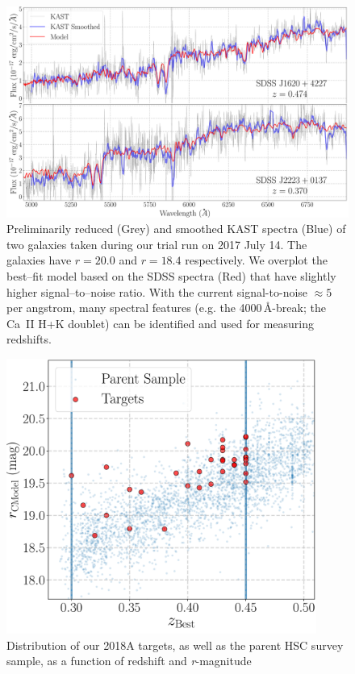 \documentclass[letterpaper,12pt]{article}
\begin{document}
\begin{figure}[hbt]
\includegraphics[width=\textwidth]{specz_fig1.pdf}
\caption{
Preliminarily reduced (Grey) and smoothed KAST spectra (Blue) of two galaxies 
taken during our trial run on 2017 July 14. 
The galaxies have $r=20.0$ and $r=18.4$ respectively. 
We overplot the best--fit model based on the SDSS spectra (Red) that have 
slightly higher signal--to--noise ratio. 
With the current signal-to-noise $\approx5$ per angstrom, many spectral features (e.g.
the 4000\,\AA-break; the Ca~II H+K doublet) can be identified and used for 
measuring redshifts.}
\label{spectrum}
\end{figure}

\begin{figure}
\includegraphics[width=4in]{s16a_massive_photoz_pair_gama_kast_targets.pdf}
\caption{
Distribution of our 2018A targets, as well as the parent HSC survey sample, as a function of redshift and {\it r}-magnitude}
\end{figure}
\end{document}
